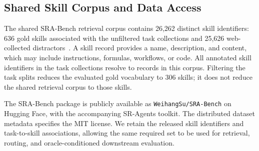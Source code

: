 \subsection{Shared Skill Corpus and Data Access}
\label{app:data-corpus}
The shared SRA-Bench retrieval corpus contains 26,262 distinct skill identifiers: 636 gold skills associated with the unfiltered task collections and 25,626 web-collected distractors~\citep{su2026skillretrieval}. A skill record provides a name, description, and content, which may include instructions, formulas, workflows, or code. All annotated skill identifiers in the task collections resolve to records in this corpus. Filtering the task splits reduces the evaluated gold vocabulary to 306 skills; it does not reduce the shared retrieval corpus to those skills.

The SRA-Bench package is publicly available as \texttt{WeihangSu/SRA-Bench} on Hugging Face, with the accompanying SR-Agents toolkit. The distributed dataset metadata specifies the MIT license. We retain the released skill identifiers and task-to-skill associations, allowing the same required set to be used for retrieval, routing, and oracle-conditioned downstream evaluation.
